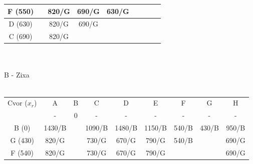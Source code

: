 \documentclass[12pt]{article}
\begin{document}
\begin{enumerate}
\begin{tabular}{|c|c|c|c|c|c|c|c|c|}
F (550)      &                          & 820/G                        & {\color[HTML]{000000} 690/G} & {\color[HTML]{FE0000} 630/G} &                              &                              &                              &                              \\ \hline
D (630)      &                          & 820/G                        & {\color[HTML]{FE0000} 690/G} & {\color[HTML]{FE0000} }      &                              &                              &                              &                              \\ \hline
C (690)      &                          & {\color[HTML]{FE0000} 820/G} &                              &                              &                              &                              &                              &                              \\ \hline
\end{tabular}
\\
\\
B - Zixa
\\
\\
\begin{tabular}{|c|c|c|c|c|c|c|c|c|}
\hline
Cvor ($x_r$) & A                            & B                        & C                            & D                            & E                             & F                            & G                            & H                            \\ \cline{2-9} 
             & {\color[HTML]{000000} -}     & {\color[HTML]{FE0000} 0} & -                            & -                            & -                             & -                            & -                            & -                            \\ \hline
B (0)        & 1430/B                       &                          & 1090/B                       & 1480/B                       & {\color[HTML]{333333} 1150/B} & 540/B                        & {\color[HTML]{FE0000} 430/B} & 950/B                        \\ \hline
G (430)      & 820/G                        &                          & 730/G                        & 670/G                        & 790/G                         & {\color[HTML]{FE0000} 540/B} &                              & {\color[HTML]{333333} 690/G} \\ \hline
F (540)      & 820/G                        &                          & 730/G                        & {\color[HTML]{FE0000} 670/G} & 790/G                         &                              & {\color[HTML]{FE0000} }      & 690/G                        \\ \hline

\end{tabular}
\end{enumerate}
\end{document}
